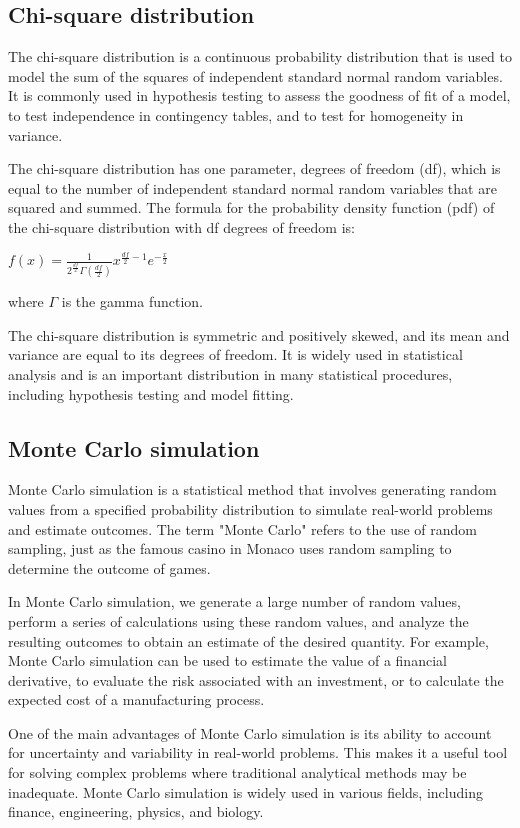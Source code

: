 \documentclass[12pt, a4paper, oneside]{article}
\begin{document}
\subsection{ Chi-square distribution }
The chi-square distribution is a continuous probability distribution that is used to model the sum of the squares of independent standard normal random variables. It is commonly used in hypothesis testing to assess the goodness of fit of a model, to test independence in contingency tables, and to test for homogeneity in variance.

The chi-square distribution has one parameter, degrees of freedom (df), which is equal to the number of independent standard normal random variables that are squared and summed. The formula for the probability density function (pdf) of the chi-square distribution with df degrees of freedom is:

$f(x) = \frac{1}{2^{\frac{df}{2}} \Gamma(\frac{df}{2})} x^{\frac{df}{2} - 1} e^{-\frac{x}{2}}$

where $\Gamma$ is the gamma function.

The chi-square distribution is symmetric and positively skewed, and its mean and variance are equal to its degrees of freedom. It is widely used in statistical analysis and is an important distribution in many statistical procedures, including hypothesis testing and model fitting.
\subsection{ Monte Carlo simulation }
Monte Carlo simulation is a statistical method that involves generating random values from a specified probability distribution to simulate real-world problems and estimate outcomes. The term "Monte Carlo" refers to the use of random sampling, just as the famous casino in Monaco uses random sampling to determine the outcome of games.

In Monte Carlo simulation, we generate a large number of random values, perform a series of calculations using these random values, and analyze the resulting outcomes to obtain an estimate of the desired quantity. For example, Monte Carlo simulation can be used to estimate the value of a financial derivative, to evaluate the risk associated with an investment, or to calculate the expected cost of a manufacturing process.

One of the main advantages of Monte Carlo simulation is its ability to account for uncertainty and variability in real-world problems. This makes it a useful tool for solving complex problems where traditional analytical methods may be inadequate. Monte Carlo simulation is widely used in various fields, including finance, engineering, physics, and biology.
\end{document}
